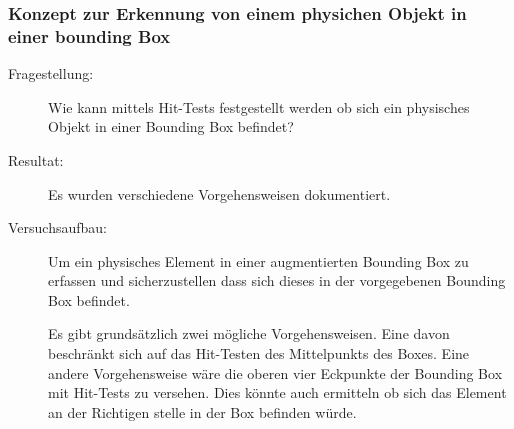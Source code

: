 \subsubsection{Konzept zur Erkennung von einem physichen Objekt in einer bounding Box}
\begin{description}
    \item[Fragestellung:] Wie kann mittels Hit-Tests festgestellt werden ob sich ein physisches Objekt in einer Bounding Box befindet?
	\item[Resultat:] Es wurden verschiedene Vorgehensweisen dokumentiert. 
    \item[Versuchsaufbau:] Um ein physisches Element in einer augmentierten Bounding Box zu erfassen und sicherzustellen dass sich dieses in der vorgegebenen Bounding Box befindet. 

    Es gibt grundsätzlich zwei mögliche Vorgehensweisen. Eine davon beschränkt sich auf das Hit-Testen des Mittelpunkts des Boxes. Eine andere Vorgehensweise wäre die oberen vier Eckpunkte der Bounding Box mit Hit-Tests zu versehen. Dies könnte auch ermitteln ob sich das Element an der Richtigen stelle in der Box befinden würde.


\end{description}
